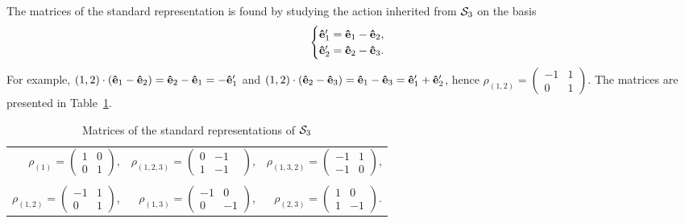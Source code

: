 \begin{example}
	The matrices of the standard representation is found by studying the action inherited from $\mathcal{S}_3$ on the basis 
	\begin{align*}
		\begin{cases}
			\mathbf{\hat{e}}'_1 = \mathbf{\hat{e}}_1-\mathbf{\hat{e}}_2, \\
			\mathbf{\hat{e}}'_2 = \mathbf{\hat{e}}_2-\mathbf{\hat{e}}_3.
		\end{cases}
	\end{align*}
	For example, $(1,2)\cdot (\mathbf{\hat{e}}_1-\mathbf{\hat{e}}_2) = \mathbf{\hat{e}}_2-\mathbf{\hat{e}}_1 = -\mathbf{\hat{e}}'_1$ and $(1,2) \cdot (\mathbf{\hat{e}}_2-\mathbf{\hat{e}}_3) = \mathbf{\hat{e}}_1-\mathbf{\hat{e}}_3 = \mathbf{\hat{e}}'_1 + \mathbf{\hat{e}}'_2$, hence $\rho_{(1,2)} = \left(\begin{smallmatrix}
		-1 & 1 \\ 0 & 1
	\end{smallmatrix}\right)$. The matrices are presented in Table~\ref{table:standardS3}.
	
	\begin{table}[hbt!]
		\centering
		\begin{tabular}{r r r}
			$\rho_{(1)} = 
			\begin{pmatrix}
				1 & 0 \\
				0 & 1
			\end{pmatrix}$, & 
			$\rho_{(1,2,3)} = 
			\begin{pmatrix}
				0 & -1 &\\
				1 & -1
			\end{pmatrix}$, & 
			$\rho_{(1,3,2)} = 
			\begin{pmatrix}
				-1 & 1  \\
				-1 & 0
			\end{pmatrix}$, \\ & & \\
			$\rho_{(1,2)} = 
			\begin{pmatrix}
				-1 & 1 \\
				0  & 1
			\end{pmatrix}$, &
			$\rho_{(1,3)} = 
			\begin{pmatrix}
				-1 & 0 \\
				0 & -1 
			\end{pmatrix}$, &
			$\rho_{(2,3)} = 
			\begin{pmatrix}
				1 & 0 \\
				1 & -1 
			\end{pmatrix}$.
		\end{tabular}
		\caption{Matrices of the standard representations of $\mathcal{S}_3$}
		\label{table:standardS3}
	\end{table}
\end{example}
